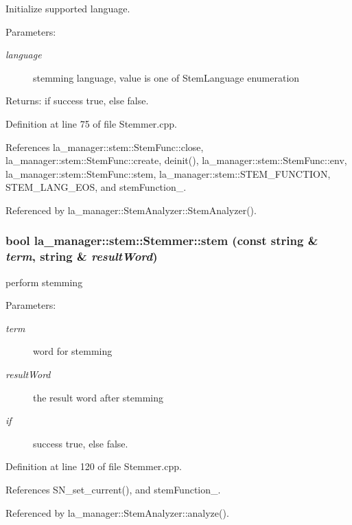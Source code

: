 \begin{CompactItemize}
Initialize supported language. \begin{Desc}
\item[Parameters:]
\begin{description}
\item[{\em language}]stemming language, value is one of StemLanguage enumeration \end{description}
\end{Desc}
\begin{Desc}
\item[Returns:]if success true, else false. \end{Desc}


Definition at line 75 of file Stemmer.cpp.

References la\_\-manager::stem::StemFunc::close, la\_\-manager::stem::StemFunc::create, deinit(), la\_\-manager::stem::StemFunc::env, la\_\-manager::stem::StemFunc::stem, la\_\-manager::stem::STEM\_\-FUNCTION, STEM\_\-LANG\_\-EOS, and stemFunction\_\-.

Referenced by la\_\-manager::StemAnalyzer::StemAnalyzer().\hypertarget{classla__manager_1_1stem_1_1Stemmer_6c0434f1b3756181a02159e3d4f537bd}{
\subsubsection[{stem}]{\setlength{\rightskip}{0pt plus 5cm}bool la\_\-manager::stem::Stemmer::stem (const string \& {\em term}, \/  string \& {\em resultWord})}}
\label{classla__manager_1_1stem_1_1Stemmer_6c0434f1b3756181a02159e3d4f537bd}


perform stemming \begin{Desc}
\item[Parameters:]
\begin{description}
\item[{\em term}]word for stemming \item[{\em resultWord}]the result word after stemming \item[{\em if}]success true, else false. \end{description}
\end{Desc}


Definition at line 120 of file Stemmer.cpp.

References SN\_\-set\_\-current(), and stemFunction\_\-.

Referenced by la\_\-manager::StemAnalyzer::analyze().


\end{CompactItemize}
